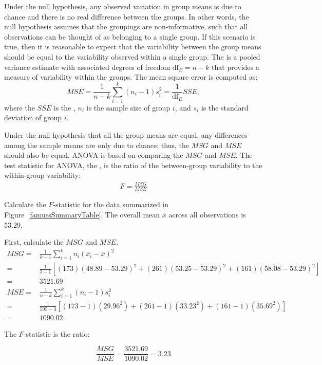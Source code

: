 Under the null hypothesis, any observed variation in group means is due to chance and there is no real difference between the groups. In other words, the null hypothesis assumes that the groupings are non-informative, such that all observations can be thought of as belonging to a single group. If this scenario is true, then it is reasonable to expect that the variability between the group means should be equal to the variability observed within a single group. The  is a pooled variance estimate with associated degrees of freedom $\textrm{df}_E=n-k$ that provides a measure of variability within the groups. The mean square error is computed as:
\[MSE = \frac{1}{n-k}\sum_{i=1}^{k} (n_i-1)s_i^{2} = \frac{1}{\textrm{df}_{E}}SSE, \]
where the $SSE$ is the , $n_i$ is the sample size of group $i$, and $s_i$ is the standard deviation of group $i$.

Under the null hypothesis that all the group means are equal, any differences among the sample means are only due to chance; thus, the $MSG$ and $MSE$ should also be equal. ANOVA is based on comparing the $MSG$ and $MSE$. The test statistic for ANOVA, the , is the ratio of the between-group variability to the within-group variability:
\begin{align}
\label{formulaForTheFStatistic}%
F = \frac{MSG}{MSE}
\end{align}

\begin{examplewrap}
\begin{nexample}{Calculate the $F$-statistic for the  data summarized in Figure~\ref{famussSummaryTable}. The overall mean $\overline{x}$ across all observations is 53.29.}
 
First, calculate the $MSG$ and $MSE$. 
\vspace{0mm}
\begin{align*}
MSG =& \frac{1}{k-1}\sum_{i=1}^{k} n_{i}\left(\bar{x}_{i} - \bar{x}\right)^{2} \\
=& \frac{1}{3-1} [(173)(48.89 - 53.29)^{2} + (261)(53.25 - 53.29)^{2} + (161)(58.08 - 53.29)^{2} ]\\
=& 3521.69 \\
MSE =& \frac{1}{n-k}\sum_{i=1}^{k} (n_i-1)s_i^{2} \\
=& \frac{1}{595-3}[(173-1)(29.96^2) + (261-1)(33.23^2) + (161-1)(35.69^2)] \\
=& 1090.02
\end{align*}

The $F$-statistic is the ratio:

\[\dfrac{MSG}{MSE} = \dfrac{3521.69}{1090.02} = 3.23 \]
\end{nexample}
\end{examplewrap} 

